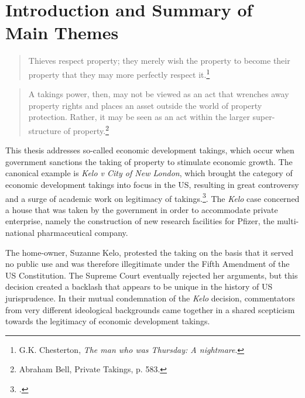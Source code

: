 \chapter{Introduction and Summary of Main Themes}\label{chap:intro}

\begin{quote}
Thieves respect property; they merely wish the property to become their property that they may more perfectly respect it.\footnote{G.K. Chesterton, {\it The man who was Thursday: A nightmare}.}
\end{quote}
\begin{quote}
A takings power, then, may not be viewed as an act that wrenches away property rights and places an asset outside the world of property protection. Rather, it may be seen as an act within the larger super-structure of property.\footnote{Abraham Bell, Private Takings, p. 583.}
\end{quote}
%
%
%
%
This thesis addresses so-called economic development takings, which occur when government sanctions the taking of property to stimulate economic growth.  The canonical example is {\it Kelo v City of New London}, which brought the category of economic development takings into focus in the US, resulting in great controversy and a surge of academic work on legitimacy of takings.\footcite{kelo05}. The {\it Kelo} case concerned a house that was taken by the government in order to accommodate private enterprise, namely the construction of new research facilities for Pfizer, the multi-national pharmaceutical company.

The home-owner, Suzanne Kelo, protested the taking on the basis that it served no public use and was therefore illegitimate under the Fifth Amendment of the US Constitution. The Supreme Court eventually rejected her arguments, but this decision created a backlash that appears to be unique in the history of US jurisprudence. In their mutual condemnation of the {\it Kelo} decision, commentators from very different ideological backgrounds came together in a shared scepticism towards the legitimacy of economic development takings.


